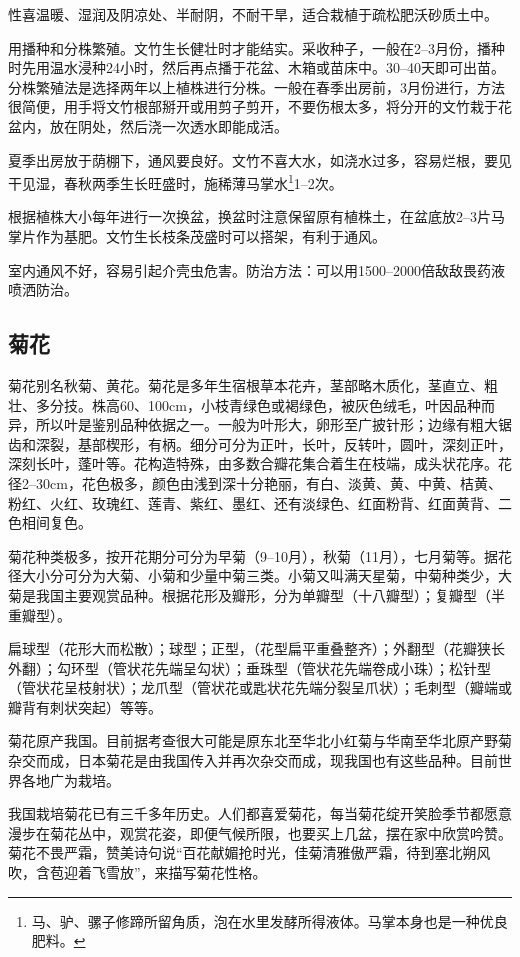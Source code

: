 \documentclass{ctexbook}
\begin{document}
性喜温暖、湿润及阴凉处、半耐阴，不耐干旱，适合栽植于疏松肥沃砂质土中。

用播种和分株繁殖。文竹生长健壮时才能结实。采收种子，一般在2--3月份，播种时先用温水浸种24小时，然后再点播于花盆、木箱或苗床中。30--40天即可出苗。分株繁殖法是选择两年以上植株进行分株。一般在春季出房前，3月份进行，方法很简便，用手将文竹根部掰开或用剪子剪开，不要伤根太多，将分开的文竹栽于花盆内，放在阴处，然后浇一次透水即能成活。

夏季出房放于荫棚下，通风要良好。文竹不喜大水，如浇水过多，容易烂根，要见干见湿，春秋两季生长旺盛时，施稀薄马掌水\footnote{马、驴、骡子修蹄所留角质，泡在水里发酵所得液体。马掌本身也是一种优良肥料。}1--2次。

根据植株大小每年进行一次换盆，换盆时注意保留原有植株土，在盆底放2--3片马掌片作为基肥。文竹生长枝条茂盛时可以搭架，有利于通风。

室内通风不好，容易引起介壳虫危害。防治方法：可以用1500--2000倍敌敌畏药液喷洒防治。
\subsection{菊花}
菊花别名秋菊、黄花。菊花是多年生宿根草本花卉，茎部略木质化，茎直立、粗壮、多分技。株高60、100cm，小枝青绿色或褐绿色，被灰色绒毛，叶因品种而异，所以叶是鉴别品种依据之一。一般为叶形大，卵形至广披针形；边缘有粗大锯齿和深裂，基部楔形，有柄。细分可分为正叶，长叶，反转叶，圆叶，深刻正叶，深刻长叶，蓬叶等。花构造特殊，由多数合瓣花集合着生在枝端，成头状花序。花径2--30cm，花色极多，颜色由浅到深十分艳丽，有白、淡黄、黄、中黄、桔黄、粉红、火红、玫瑰红、莲青、紫红、墨红、还有淡绿色、红面粉背、红面黄背、二色相间复色。

菊花种类极多，按开花期分可分为早菊（9--10月），秋菊（11月），七月菊等。据花径大小分可分为大菊、小菊和少量中菊三类。小菊又叫满天星菊，中菊种类少，大菊是我国主要观赏品种。根据花形及瓣形，分为单瓣型（十八瓣型）；复瓣型（半重瓣型）。

扁球型（花形大而松散）；球型；正型，（花型扁平重叠整齐）；外翻型（花瓣狭长外翻）；勾环型（管状花先端呈勾状）；垂珠型（管状花先端卷成小珠）；松针型（管状花呈枝射状）；龙爪型（管状花或匙状花先端分裂呈爪状）；毛刺型（瓣端或瓣背有刺状突起）等等。

菊花原产我国。目前据考查很大可能是原东北至华北小红菊与华南至华北原产野菊杂交而成，日本菊花是由我国传入并再次杂交而成，现我国也有这些品种。目前世界各地广为栽培。

我国栽培菊花已有三千多年历史。人们都喜爱菊花，每当菊花绽开笑脸季节都愿意漫步在菊花丛中，观赏花姿，即便气候所限，也要买上几盆，摆在家中欣赏吟赞。菊花不畏严霜，赞美诗句说“百花献媚抢时光，佳菊清雅傲严霜，待到塞北朔风吹，含苞迎着飞雪放”，来描写菊花性格。
\end{document}
